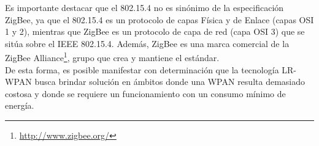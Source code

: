 Es importante destacar que el 802.15.4 no es sinónimo de la especificación ZigBee, ya que el 802.15.4 es un protocolo de capas Física y de Enlace (capas OSI 1 y 2), mientras que ZigBee es un protocolo de capa de red (capa OSI 3) que se sitúa sobre el IEEE 802.15.4. Además, ZigBee es una marca comercial de la ZigBee Alliance\footnote{\url{http://www.zigbee.org/}}, grupo que crea y mantiene el estándar.\\

De esta forma, es posible manifestar con determinación que la tecnología LR-WPAN busca brindar solución en ámbitos donde una WPAN resulta demasiado costosa y donde se requiere un funcionamiento con un consumo mínimo de energía.\\ 



